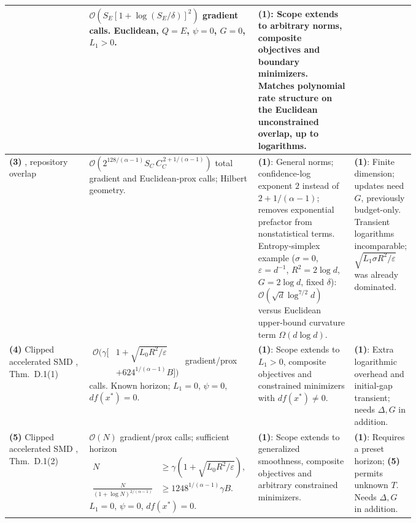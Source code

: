 \begin{table}[tp]
\begin{threeparttable}
\begin{tabularx}{\linewidth}{@{}>{\raggedright\arraybackslash}p{0.20\linewidth}>{\raggedright\arraybackslash}p{0.325\linewidth}>{\raggedright\arraybackslash}p{0.245\linewidth}>{\raggedright\arraybackslash}X@{}}
& $\mathcal{O}\!\left(S_E[1+\log(S_E/\delta)]^2\right)$ gradient calls. Euclidean, $Q=E$, $\psi=0$, $G=0$, $L_1>0$.
& \textbf{(1)}: Scope extends to arbitrary norms, composite objectives and boundary minimizers. Matches polynomial rate structure on the Euclidean unconstrained overlap, up to logarithms.
& \\
\midrule
\textbf{(3)} \citep{sgmRepositoryComposite2026}, repository overlap
& $\mathcal{O}\!\left(2^{128/(\alpha-1)} S_C\, C_C^{\,2+1/(\alpha-1)}\right)$ total gradient and Euclidean-prox calls; Hilbert geometry.
& \textbf{(1)}: General norms; confidence-log exponent $2$ instead of $2+1/(\alpha-1)$; removes exponential prefactor from nonstatistical terms. Entropy-simplex example ($\sigma=0$, $\varepsilon=d^{-1}$, $R^2=2\log d$, $G=2\log d$, fixed $\delta$): $\mathcal{O}(\sqrt d\log^{7/2}d)$ versus Euclidean upper-bound curvature term $\Omega(d\log d)$.
& \textbf{(1)}: Finite dimension; updates need $G$, previously budget-only. Transient logarithms incomparable; $\sqrt{L_1\sigma R^2/\varepsilon}$ was already dominated. \\
\midrule
\textbf{(4)} Clipped accelerated SMD \citep{sgmNguyenNeurips2023}, Thm.~D.1(1)
& $\begin{aligned}\mathcal{O}\!\bigl(\gamma[&1+\sqrt{L_0R^2/\varepsilon}\\&+624^{1/(\alpha-1)}B]\bigr)\end{aligned}$ gradient/prox calls. Known horizon; $L_1=0$, $\psi=0$, $df(x^*)=0$.
& \textbf{(1)}: Scope extends to $L_1>0$, composite objectives and constrained minimizers with $df(x^*)\ne0$.
& \textbf{(1)}: Extra logarithmic overhead and initial-gap transient; needs $\Delta,G$ in addition. \\
\midrule
\textbf{(5)} Clipped accelerated SMD \citep{sgmNguyenNeurips2023}, Thm.~D.1(2)
& $\mathcal{O}(N)$ gradient/prox calls; sufficient horizon\newline
$\begin{aligned}N&\ge\gamma\left(1+\sqrt{L_0R^2/\varepsilon}\right),\\
\frac{N}{(1+\log N)^{2/(\alpha-1)}}&\ge1248^{1/(\alpha-1)}\gamma B.
\end{aligned}$\newline
$L_1=0$, $\psi=0$, $df(x^*)=0$.
& \textbf{(1)}: Scope extends to generalized smoothness, composite objectives and arbitrary constrained minimizers.
& \textbf{(1)}: Requires a preset horizon; \textbf{(5)} permits unknown $T$. Needs $\Delta,G$ in addition. \\
\bottomrule
\end{tabularx}

\end{threeparttable}
\end{table}
